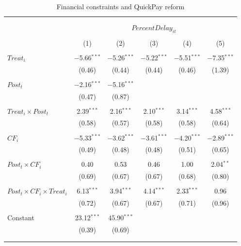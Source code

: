 \documentclass[
]{article}
\begin{document}
\begin{table}[H] \centering 
  \caption{Financial constraints and QuickPay reform} 
  \label{} 
\small 
\begin{tabular}{@{\extracolsep{-2pt}}lccccc} 
\\[-1.8ex]\hline 
\hline \\[-1.8ex] 
\\[-1.8ex] & \multicolumn{5}{c}{$PercentDelay_{it}$  } \\ 
\\[-1.8ex] & (1) & (2) & (3) & (4) & (5)\\ 
\hline \\[-1.8ex] 
 $Treat_i$ & $-$5.66$^{***}$ & $-$5.26$^{***}$ & $-$5.22$^{***}$ & $-$5.51$^{***}$ & $-$7.35$^{***}$ \\ 
  & (0.46) & (0.44) & (0.44) & (0.46) & (1.39) \\ 
  & & & & & \\ 
 $Post_t$ & $-$2.16$^{***}$ & $-$5.16$^{***}$ &  &  &  \\ 
  & (0.47) & (0.87) &  &  &  \\ 
  & & & & & \\ 
 $Treat_i \times Post_t$ & 2.39$^{***}$ & 2.16$^{***}$ & 2.10$^{***}$ & 3.14$^{***}$ & 4.58$^{***}$ \\ 
  & (0.58) & (0.57) & (0.58) & (0.58) & (0.64) \\ 
  & & & & & \\ 
 $CF_i$ & $-$5.33$^{***}$ & $-$3.62$^{***}$ & $-$3.61$^{***}$ & $-$4.20$^{***}$ & $-$2.89$^{***}$ \\ 
  & (0.49) & (0.48) & (0.48) & (0.51) & (0.65) \\ 
  & & & & & \\ 
 $Post_t \times CF_i$ & 0.40 & 0.53 & 0.46 & 1.00 & 2.04$^{**}$ \\ 
  & (0.69) & (0.67) & (0.67) & (0.68) & (0.80) \\ 
  & & & & & \\ 
 $Post_t \times CF_i \times Treat_i$ & 6.13$^{***}$ & 3.94$^{***}$ & 4.14$^{***}$ & 2.33$^{***}$ & 0.96 \\ 
  & (0.72) & (0.67) & (0.67) & (0.71) & (0.96) \\ 
  & & & & & \\ 
 Constant & 23.12$^{***}$ & 45.90$^{***}$ &  &  &  \\ 
  & (0.39) & (0.69) &  &  &  \\ 
  & & & & & \\ 
\hline \\[-1.8ex] 

\end{tabular}
\end{table}
\end{document}

